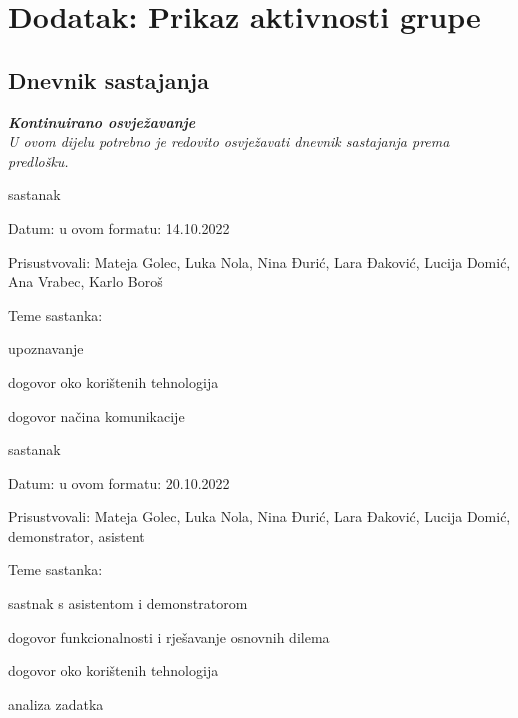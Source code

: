 \chapter*{Dodatak: Prikaz aktivnosti grupe}
		
		\section*{Dnevnik sastajanja}
		
		\textbf{\textit{Kontinuirano osvježavanje}}\\
		
		 \textit{U ovom dijelu potrebno je redovito osvježavati dnevnik sastajanja prema predlošku.}
		
		\begin{packed_enum}
			\item  sastanak
			
			\item[] \begin{packed_item}
				\item Datum: u ovom formatu: 14.10.2022 
				\item Prisustvovali: Mateja Golec, Luka Nola, Nina Đurić, Lara Đaković, Lucija Domić, Ana Vrabec, Karlo Boroš
				\item Teme sastanka: 
				\begin{packed_item}
					\item  upoznavanje
					\item  dogovor oko korištenih tehnologija
					\item  dogovor načina komunikacije
				\end{packed_item}
			\end{packed_item}
			

			\item  sastanak
			
			\item[] \begin{packed_item}
				\item Datum: u ovom formatu: 20.10.2022 
				\item Prisustvovali: Mateja Golec, Luka Nola, Nina Đurić, Lara Đaković, Lucija Domić, demonstrator, asistent
				\item Teme sastanka:
				\begin{packed_item}
					\item  sastnak s asistentom i demonstratorom
					\item  dogovor funkcionalnosti i rješavanje osnovnih dilema
					\item  dogovor oko korištenih tehnologija
					\item  analiza zadatka
				\end{packed_item}
			\end{packed_item}
			

\end{packed_enum}
